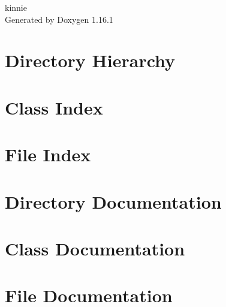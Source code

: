 \documentclass[twoside]{book}
\newcommand{\+}{\discretionary{\mbox{\scriptsize$\hookleftarrow$}}{}{}}
\newcommand{\clearemptydoublepage}{%
    \newpage{\pagestyle{empty}\cleardoublepage}%
  }
\begin{document}
  \raggedbottom
    \hypersetup{pageanchor=false,
                bookmarksnumbered=true,
                pdfencoding=unicode
               }
  \begin{titlepage}
  \vspace*{7cm}
  \begin{center}%
  {\Large kinnie}\\
  \vspace*{1cm}
  {\large Generated by Doxygen 1.16.1}\\
  \end{center}
  \end{titlepage}
  \clearemptydoublepage
  \tableofcontents
  \clearemptydoublepage
  \hypersetup{pageanchor=true}
\chapter{Directory Hierarchy}

\chapter{Class Index}

\chapter{File Index}

\chapter{Directory Documentation}


\chapter{Class Documentation}




\chapter{File Documentation}












  \backmatter
  \newpage
  \clearemptydoublepage
  \printindex
\end{document}

